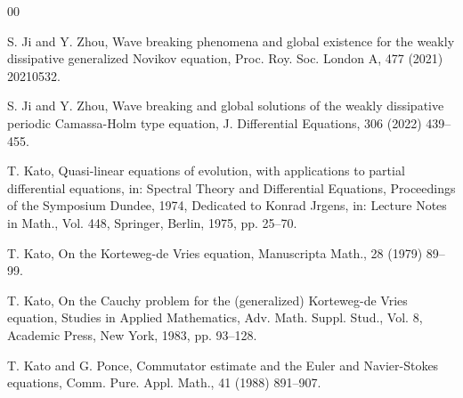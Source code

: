 \documentclass[preprint,12pt]{elsarticle}
\numberwithin{equation}{section}
\begin{document}
\begin{thebibliography}{00}



 S. Ji and Y. Zhou, Wave breaking phenomena and global existence for the weakly dissipative generalized Novikov equation, Proc. Roy. Soc. London A, 477 (2021) 20210532.

 S. Ji and Y. Zhou, Wave breaking and global solutions of the weakly dissipative periodic Camassa-Holm type equation, J. Differential Equations, 306 (2022) 439--455.



 T. Kato, Quasi-linear equations of evolution, with applications to partial differential equations, in: Spectral Theory and Differential Equations, Proceedings of the Symposium Dundee, 1974, Dedicated to Konrad Jrgens, in: Lecture Notes in Math., Vol. 448, Springer, Berlin, 1975, pp. 25--70.

 T. Kato, On the Korteweg-de Vries equation, Manuscripta Math., 28 (1979) 89--99.

 T. Kato, On the Cauchy problem for the (generalized) Korteweg-de Vries equation, Studies in Applied Mathematics, Adv. Math. Suppl. Stud., Vol. 8, Academic Press, New York, 1983, pp. 93--128.

 T. Kato and G. Ponce, Commutator estimate and the Euler and Navier-Stokes equations, Comm. Pure. Appl. Math., 41 (1988) 891--907.



\end{thebibliography}
\end{document}

